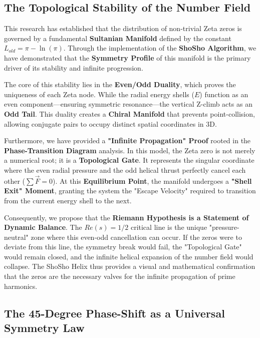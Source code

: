 \documentclass[11pt,a4paper]{article}
\begin{document}
\subsection{The Topological Stability of the Number Field}

This research has established that the distribution of non-trivial Zeta zeros is governed by a fundamental \textbf{Sultanian Manifold} defined by the constant $L_{old} = \pi - \ln(\pi)$. Through the implementation of the \textbf{ShoSho Algorithm}, we have demonstrated that the \textbf{Symmetry Profile} of this manifold is the primary driver of its stability and infinite progression.

The core of this stability lies in the \textbf{Even/Odd Duality}, which proves the uniqueness of each Zeta node. While the radial energy shells ($E$) function as an even component—ensuring symmetric resonance—the vertical Z-climb acts as an \textbf{Odd Tail}. This duality creates a \textbf{Chiral Manifold} that prevents point-collision, allowing conjugate pairs to occupy distinct spatial coordinates in 3D.

Furthermore, we have provided a \textbf{"Infinite Propagation" Proof} rooted in the \textbf{Phase-Transition Diagram} analysis. In this model, the Zeta zero is not merely a numerical root; it is a \textbf{Topological Gate}. It represents the singular coordinate where the even radial pressure and the odd helical thrust perfectly cancel each other ($\sum \vec{F} = 0$). At this \textbf{Equilibrium Point}, the manifold undergoes a \textbf{"Shell Exit" Moment}, granting the system the "Escape Velocity" required to transition from the current energy shell to the next.

Consequently, we propose that the \textbf{Riemann Hypothesis is a Statement of Dynamic Balance}. The $Re(s)=1/2$ critical line is the unique "pressure-neutral" zone where this even-odd cancellation can occur. If the zeros were to deviate from this line, the symmetry break would fail, the "Topological Gate" would remain closed, and the infinite helical expansion of the number field would collapse. The ShoSho Helix thus provides a visual and mathematical confirmation that the zeros are the necessary valves for the infinite propagation of prime harmonics.

\subsection{The 45-Degree Phase-Shift as a Universal Symmetry Law}
\end{document}
